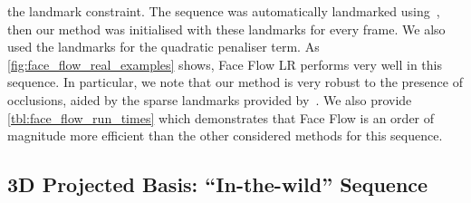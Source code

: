 the landmark constraint. The sequence was
automatically landmarked using~\cite{kazemi2014one}, then our method was initialised with
these landmarks for every frame. We also used the landmarks for the quadratic penaliser term.
As \cref{fig:face_flow_real_examples} shows, Face Flow LR performs very well in this sequence.
In particular, we note that our method is very robust to the presence of occlusions,
aided by the sparse landmarks provided by~\cite{kazemi2014one}.
We also provide \cref{tbl:face_flow_run_times}
which demonstrates that Face Flow is an order of magnitude more efficient than
the other considered methods for this sequence.
\subsection{3D Projected Basis: ``In-the-wild'' Sequence}\label{subsec:face_flow_experiments_boris}
